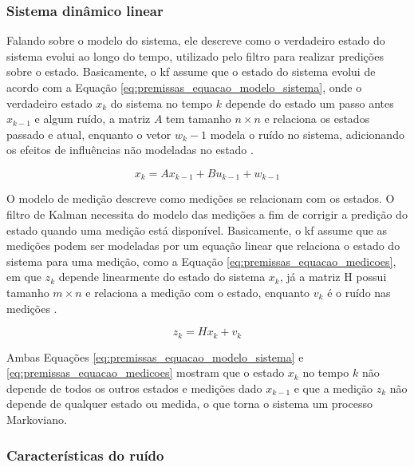 \documentclass[acronym, symbols, table]{fei}
\begin{document}
			\subsubsection{Sistema dinâmico linear}
			
				Falando sobre o modelo do sistema, ele descreve como o verdadeiro estado do sistema evolui ao longo do tempo, utilizado pelo filtro para realizar predições sobre o estado. Basicamente, o \acrshort{kf} assume que o estado do sistema evolui de acordo com a Equação \eqref{eq:premissas_equacao_modelo_sistema}, onde o verdadeiro estado $x_k$ do sistema no tempo $k$ depende do estado um passo antes $x_{k-1}$ e algum ruído, a matriz $A$ tem tamanho $n \times n$ e relaciona os estados passado e atual, enquanto o vetor $w_k-1$ modela o ruído no sistema, adicionando os efeitos de influências não modeladas no estado \cite{urrea2021kalman}.
				
				\begin{equation}\label{eq:premissas_equacao_modelo_sistema}
					x_k = Ax_{k-1} + Bu_{k-1} + w_{k-1}
				\end{equation}
			
				O modelo de medição descreve como medições se relacionam com os estados. O filtro de Kalman necessita do modelo das medições a fim de corrigir a predição do estado quando uma medição está disponível. Basicamente, o \acrshort{kf} assume que as medições podem ser modeladas por um equação linear que relaciona o estado do sistema para uma medição, como a Equação \eqref{eq:premissas_equacao_medicoes}, em que $z_k$ depende linearmente do estado do sistema $x_k$, já a matriz H possui tamanho $m \times n$ e relaciona a medição com o estado, enquanto $v_k$ é o ruído nas medições \cite{khodarahmi2023review}.
				
				\begin{equation}\label{eq:premissas_equacao_medicoes}
					z_k = Hx_k + v_k
				\end{equation}
			
				Ambas Equações \eqref{eq:premissas_equacao_modelo_sistema} e \eqref{eq:premissas_equacao_medicoes} mostram que o estado $x_k$ no tempo $k$ não depende de todos os outros estados e medições dado $x_{k-1}$ e que a medição $z_k$ não depende de qualquer estado ou medida, o que torna o sistema um processo Markoviano.
			
			\subsubsection{Características do ruído}
				
\end{document}
